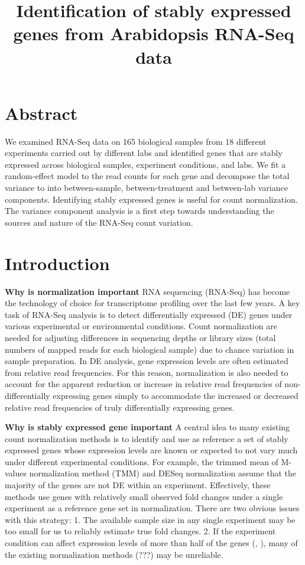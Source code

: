 \documentclass[11pt, a4paper]{article}
\title{Identification of stably expressed genes from Arabidopsis RNA-Seq data}
\date{} %
\begin{document}
\maketitle

\section*{Abstract}
We examined RNA-Seq data on 165 biological samples from 18 different
experiments carried out by different labs and identified genes that are stably
expressed across biological samples, experiment conditions, and labs. We fit a
random-effect model to the read counts for each gene and decompose the total
variance to into between-sample, between-treatment and between-lab variance
components. Identifying stably expressed genes is useful for count
normalization. The variance component analysis is a first step towards
understanding the sources and nature of the RNA-Seq count variation.


\section{Introduction}

\textbf{Why is normalization important}
RNA sequencing (RNA-Seq) has become the technology of choice for transcriptome
profiling over the last few years. A key task of RNA-Seq analysis is to detect
differentially expressed (DE) genes under various experimental or
environmental conditions. Count normalization are needed for adjusting
differences in sequencing depths or library sizes (total numbers of mapped
reads for each biological sample) due to chance variation in sample
preparation.  In DE analysis, gene expression levels are often estimated from
relative read frequencies. For this reason, normalization is also needed to
account for the apparent reduction or increase in relative read frequencies of
non-differentially expressing genes simply to accommodate the increased or
decreased relative read frequencies of truly differentially expressing genes.

\textbf{Why is stably expressed gene important}
A central idea to many existing count normalization methods is to identify and
use as reference a set of stably expressed genes whose expression levels are
known or expected to not vary much under different experimental conditions.
For example, the trimmed mean of M-values normalization method	(TMM) \citep{robinson2010scaling} and DESeq normalization \citep{anders2010differential}  assume that the majority of
the genes are not DE within an experiment. 
Effectively, these methods use genes with relatively small observed fold
changes under a single experiment as a reference gene set in normalization.
There are two obvious issues with this strategy: 1. The available sample size
in any single experiment may be too small for us to reliably estimate true
fold changes. 2.  If the experiment condition can affect expression levels of
more than half of the genes (\cite{loven2012revisiting}, \cite{wu2013use}),
many of the existing normalization methods (???) may be unreliable. 
\end{document}
